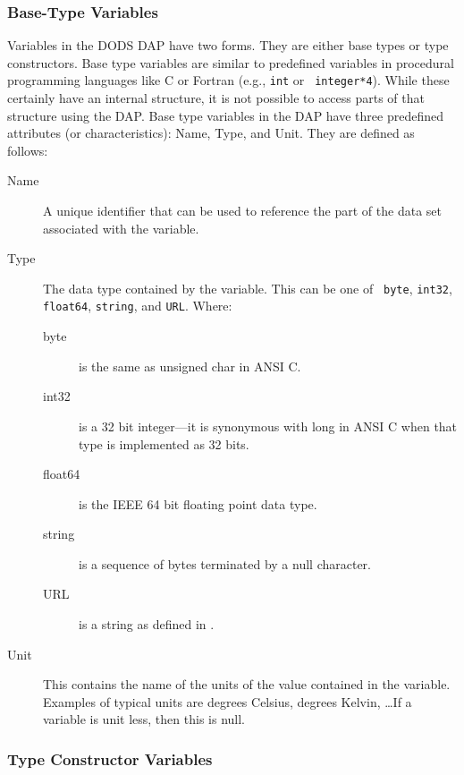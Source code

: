 \subsubsection{Base-Type Variables}
\label{base-type-variables}

Variables in the DODS DAP have two forms. They are either base types or type
constructors. Base type variables are similar to predefined variables in
procedural programming languages like C or Fortran (e.g., {\tt int} or {\tt
  integer*4}).  While these certainly have an internal structure, it is not
possible to access parts of that structure using the DAP\@. Base type
variables in the DAP have three predefined attributes (or characteristics):
Name, Type, and Unit.  They are defined as follows:

\begin{description}

\item [Name] A unique identifier that can be used to reference the part of
  the data set associated with the variable.

\item [Type] The data type contained by the variable. This can be one of {\tt
    byte}, {\tt int32}, {\tt float64}, {\tt string}, and {\tt URL}\@.
  Where:

\begin{description}
\item [byte] is the same as unsigned char in ANSI C\@.
\item [int32] is a 32 bit integer---it is synonymous with long in
  ANSI C when that type is implemented as 32 bits.
\item [float64] is the IEEE 64 bit floating point data type.
\item [string] is a sequence of bytes terminated by a null character.
\item [URL] is a string as defined in \URL\@.
\end{description}

\item [Unit] This contains the name of the units of the value contained in
  the variable.  Examples of typical units are degrees Celsius, degrees
  Kelvin, \ldots If a variable is unit less, then this is null.

\end{description}  

\subsubsection{Type Constructor Variables} 

